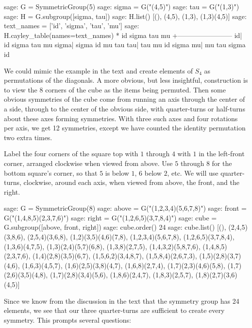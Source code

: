 %
\begin{sageexample}
sage: G = SymmetricGroup(5)
sage: sigma = G("(4,5)")
sage: tau = G("(1,3)")
sage: H = G.subgroup([sigma, tau])
sage: H.list()
[(), (4,5), (1,3), (1,3)(4,5)]
sage: text_names = ['id', 'sigma', 'tau', 'mu']
sage: H.cayley_table(names=text_names)
    *     id sigma   tau    mu
     +------------------------
   id|    id sigma   tau    mu
sigma| sigma    id    mu   tau
  tau|   tau    mu    id sigma
   mu|    mu   tau sigma    id
\end{sageexample}
%
%
We could mimic the example in the text and create elements of $S_4$ as permutations of the diagonals.  A more obvious, but less insightful, construction is to view the 8 corners of the cube as the items being permuted.  Then some obvious symmetries of the cube come from running an axis through the center of a side, through to the center of the obvious side, with quarter-turns or half-turns about these axes forming symmetries.  With three such axes and four rotations per axis, we get 12 symmetries, except we have counted the identity permutation two extra times.\par
%
Label the four corners of the square top with $1$ through $4$ with $1$ in the left-front corner, arranged clockwise when viewed from above.  Use $5$ through $8$ for the bottom square's corner, so that $5$ is below $1$, $6$ below $2$, etc.  We will use quarter-turns, clockwise, around each axis, when viewed from above, the front, and the right.
%
\begin{sageexample}
sage: G = SymmetricGroup(8)
sage: above = G("(1,2,3,4)(5,6,7,8)")
sage: front = G("(1,4,8,5)(2,3,7,6)")
sage: right = G("(1,2,6,5)(3,7,8,4)")
sage: cube = G.subgroup([above, front, right])
sage: cube.order()
24
sage: cube.list()
[(), (2,4,5)(3,8,6), (2,5,4)(3,6,8), (1,2)(3,5)(4,6)(7,8),
(1,2,3,4)(5,6,7,8), (1,2,6,5)(3,7,8,4), (1,3,6)(4,7,5),
(1,3)(2,4)(5,7)(6,8), (1,3,8)(2,7,5), (1,4,3,2)(5,8,7,6),
(1,4,8,5)(2,3,7,6), (1,4)(2,8)(3,5)(6,7), (1,5,6,2)(3,4,8,7),
(1,5,8,4)(2,6,7,3), (1,5)(2,8)(3,7)(4,6), (1,6,3)(4,5,7),
(1,6)(2,5)(3,8)(4,7), (1,6,8)(2,7,4), (1,7)(2,3)(4,6)(5,8),
(1,7)(2,6)(3,5)(4,8), (1,7)(2,8)(3,4)(5,6), (1,8,6)(2,4,7),
(1,8,3)(2,5,7), (1,8)(2,7)(3,6)(4,5)]
\end{sageexample}
%
Since we know from the discussion in the text that the symmetry group has 24 elements, we see that our three quarter-turns are sufficient to create every symmetry.  This prompts several questions:
%
